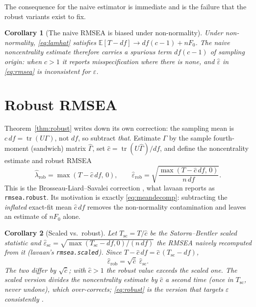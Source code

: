 \documentclass[11pt]{article}
\newcommand{\E}{\mathbb{E}}
\newcommand{\tr}{\operatorname{tr}}
\newcommand{\rmsea}{\widehat{\varepsilon}}
\theoremstyle{plain}
\newtheorem{corollary}{Corollary}
\theoremstyle{remark}
\begin{document}
The consequence for the naive estimator is immediate and is the failure that the
robust variants exist to fix.

\begin{corollary}[The naive RMSEA is biased under non-normality]\label{cor:bias}
Under non-normality, \eqref{eq:lamhat} satisfies
$\E[T-df]\to df(c-1)+nF_0$. The naive noncentrality estimate therefore carries a
spurious term $df(c-1)$ of sampling origin: when $c>1$ it reports
misspecification where there is none, and $\rmsea$ in \eqref{eq:rmsea} is
inconsistent for $\varepsilon$.
\end{corollary}

\section{Robust RMSEA}

Theorem~\ref{thm:robust} writes down its own correction: the sampling mean is
$c\,df=\tr(U\Gamma)$, not $df$, so subtract \emph{that}. Estimate $\Gamma$ by the
sample fourth-moment (sandwich) matrix $\hat\Gamma$, set
$\hat c=\tr(U\hat\Gamma)/df$, and define the noncentrality estimate and robust
RMSEA
\begin{equation}\label{eq:robust}
  \hat\lambda_{\mathrm{rob}} = \max(T-\hat c\,df,\,0),
  \qquad
  \rmsea_{\mathrm{rob}} = \sqrt{\frac{\max(T-\hat c\,df,\,0)}{n\,df}} .
\end{equation}
This is the Brosseau-Liard--Savalei correction
\cite{brosseauliardsavalei2012,savalei2018}, what lavaan reports as
\texttt{rmsea.robust}. Its motivation is exactly \eqref{eq:meandecomp}:
subtracting the \emph{inflated} exact-fit mean $\hat c\,df$ removes the
non-normality contamination and leaves an estimate of $nF_0$ alone.

\begin{corollary}[Scaled vs.\ robust]\label{cor:scaledrobust}
Let $T_{\mathrm{sc}}=T/\hat c$ be the Satorra--Bentler scaled statistic and
$\rmsea_{\mathrm{sc}}=\sqrt{\max(T_{\mathrm{sc}}-df,0)/(n\,df)}$ the RMSEA naively
recomputed from it (lavaan's \texttt{rmsea.scaled}). Since
$T-\hat c\,df=\hat c\,(T_{\mathrm{sc}}-df)$,
\[
  \rmsea_{\mathrm{rob}} = \sqrt{\hat c}\;\rmsea_{\mathrm{sc}} .
\]
The two differ by $\sqrt{\hat c}$; with $\hat c>1$ the robust value exceeds the
scaled one. The scaled version divides the noncentrality estimate by $\hat c$ a
second time (once in $T_{\mathrm{sc}}$, never undone), which over-corrects;
\eqref{eq:robust} is the version that targets $\varepsilon$ consistently
\cite{savalei2018}.
\end{corollary}
\end{document}
